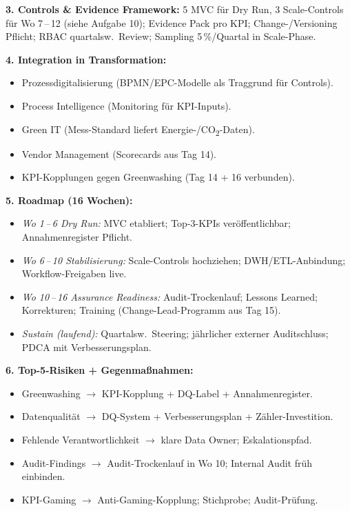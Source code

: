 \documentclass[11pt,a4paper,oneside]{article}
\begin{document}
\begin{loesungbox}
\smallskip
\textbf{3. Controls \& Evidence Framework:} 5 MVC f\"ur Dry Run, 3 Scale-Controls f\"ur Wo 7\,--\,12 (siehe Aufgabe 10); Evidence Pack pro KPI; Change-/Versioning Pflicht; RBAC quartalsw.\ Review; Sampling 5\,\%/Quartal in Scale-Phase.

\smallskip
\textbf{4. Integration in Transformation:}
\begin{itemize}
  \item Prozessdigitalisierung (BPMN/EPC-Modelle als Trag\-grund f\"ur Controls).
  \item Process Intelligence (Monitoring f\"ur KPI-Inputs).
  \item Green IT (Mess-Standard liefert Energie-/CO\textsubscript{2}-Daten).
  \item Vendor Management (Scorecards aus Tag 14).
  \item KPI-Kopplungen gegen Greenwashing (Tag 14 + 16 verbunden).
\end{itemize}

\smallskip
\textbf{5. Roadmap (16 Wochen):}
\begin{itemize}
  \item \emph{Wo 1\,--\,6 Dry Run:} MVC etabliert; Top-3-KPIs ver\"offentlichbar; Annahmenregister Pflicht.
  \item \emph{Wo 6\,--\,10 Stabilisierung:} Scale-Controls hochziehen; DWH/ETL-Anbindung; Workflow-Freigaben live.
  \item \emph{Wo 10\,--\,16 Assurance Readiness:} Audit-Trockenlauf; Lessons Learned; Korrekturen; Training (Change-Lead-Programm aus Tag 15).
  \item \emph{Sustain (laufend):} Quartalsw.\ Steering; j\"ahrlicher externer Auditschluss; PDCA mit Verbesserungsplan.
\end{itemize}

\smallskip
\textbf{6. Top-5-Risiken + Gegenma{\ss}nahmen:}
\begin{itemize}
  \item Greenwashing $\rightarrow$ KPI-Kopplung + DQ-Label + Annahmenregister.
  \item Datenqualit\"at $\rightarrow$ DQ-System + Verbesserungsplan + Z\"ahler-Investition.
  \item Fehlende Verantwortlichkeit $\rightarrow$ klare Data Owner; Eskalationspfad.
  \item Audit-Findings $\rightarrow$ Audit-Trockenlauf in Wo 10; Internal Audit fr\"uh einbinden.
  \item KPI-Gaming $\rightarrow$ Anti-Gaming-Kopplung; Stichprobe; Audit-Pr\"ufung.
\end{itemize}


\end{loesungbox}
\end{document}
